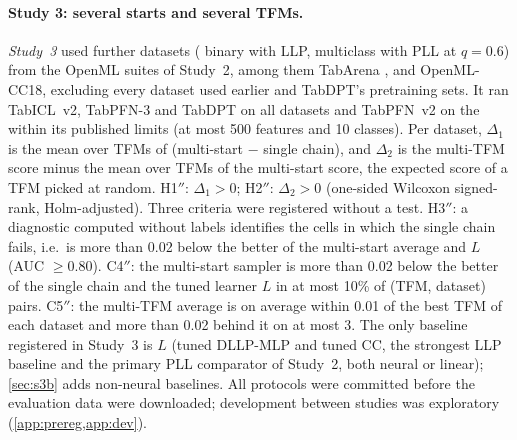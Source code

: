 \paragraph{Study 3: several starts and several TFMs.} \emph{Study~3} used  further datasets
( binary with LLP,  multiclass with PLL at $q=0.6$) from the OpenML suites of Study~2,
among them TabArena \citep{tabarena}, and OpenML-CC18, excluding every dataset used earlier and TabDPT's pretraining
sets. It ran TabICL~v2,
TabPFN-3 \citep{tabpfn3} and TabDPT \citep{tabdpt} on all datasets and TabPFN~v2 on the  within its
published limits (at most 500 features and 10 classes). Per dataset, $\Delta_1$ is the mean over TFMs of (multi-start
$-$ single chain), and $\Delta_2$ is the
multi-TFM score minus the mean over TFMs of the multi-start score, the expected score of a TFM picked at random.
H1$''$: $\Delta_1>0$; H2$''$: $\Delta_2>0$ (one-sided Wilcoxon signed-rank, Holm-adjusted). Three criteria were
registered without a test. H3$''$: a diagnostic computed without labels identifies the cells in which the single chain
fails, i.e.\ is more than 0.02 below the better of the multi-start average and $L$ (AUC $\ge0.80$). C4$''$: the multi-start sampler is more than 0.02 below the better of the single chain and the
tuned learner $L$ in at most 10\% of (TFM, dataset) pairs. C5$''$: the multi-TFM average is on average within 0.01 of
the best TFM of each dataset and more than 0.02 behind it on at most 3. The only baseline registered in Study~3 is $L$
(tuned DLLP-MLP and tuned CC, the strongest LLP baseline and the primary PLL comparator of Study~2, both neural or
linear); \cref{sec:s3b} adds non-neural baselines. All protocols were
committed before the evaluation data were downloaded; development between studies was exploratory
(\cref{app:prereg,app:dev}).

\begin{table}[t]
\centering
\caption{Studies 1 and 2, pre-registered tests of the single chain. $\Delta$: mean over datasets of (\ours{} $-$
comparator), 3 seeds each; W/T/L: datasets won/tied/lost; $p_{\mathrm{Holm}}$: two-sided Wilcoxon signed-rank,
Holm-adjusted within each hypothesis. Bold: significant in favour of \ours{}. The two PLL rows against CC coincide
only after rounding (\cref{app:s2-s1}).}
\label{tab:main}
\setlength{\tabcolsep}{3.2pt}
\resizebox{\textwidth}{!}{}
\end{table}

